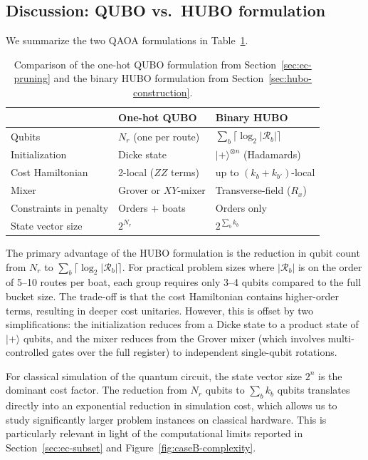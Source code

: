 \documentclass{article}
\begin{document}
\subsection{Discussion: QUBO vs.\ HUBO formulation}
\label{sec:qubo-vs-hubo}

We summarize the two QAOA formulations in Table~\ref{tab:qubo-vs-hubo}.

\begin{table}[h]
    \centering
    \begin{tabular}{>{\raggedright}p{4cm} p{4.5cm} p{4.5cm}}
    \toprule
    & \textbf{One-hot QUBO} & \textbf{Binary HUBO} \\
    \midrule
    Qubits &  $N_r$ (one per route) & $\sum_b \lceil \log_2 |\mathcal{R}_b| \rceil$ \\[0.3em]
    Initialization & Dicke state & $|+\rangle^{\otimes n}$ (Hadamards) \\[0.3em]
    Cost Hamiltonian &  2-local ($ZZ$ terms) &  up to $(k_b + k_{b'})$-local \\[0.3em]
    Mixer & Grover or $XY$-mixer & Transverse-field ($R_x$) \\[0.3em]
    Constraints in penalty & Orders + boats & Orders only \\[0.3em]
    State vector size & $2^{N_r}$ & $2^{\sum_b k_b}$ \\
    \bottomrule
    \end{tabular}
    \caption{Comparison of the one-hot QUBO formulation from Section~\ref{sec:ec-pruning} and the binary HUBO formulation from Section~\ref{sec:hubo-construction}.}
    \label{tab:qubo-vs-hubo}
\end{table}

The primary advantage of the HUBO formulation is the reduction in qubit count from $N_r$ to $\sum_b \lceil \log_2 |\mathcal{R}_b| \rceil$. For practical problem sizes where $|\mathcal{R}_b|$ is on the order of 5--10 routes per boat, each group requires only 3--4 qubits compared to the full bucket size.
The trade-off is that the cost Hamiltonian contains higher-order terms, resulting in deeper cost unitaries. However, this is offset by two simplifications: the initialization reduces from a Dicke state to a product state of $|+\rangle$ qubits, and the mixer reduces from the Grover mixer (which involves multi-controlled gates over the full register) to independent single-qubit rotations.

For classical simulation of the quantum circuit, the state vector size $2^n$ is the dominant cost factor. The reduction from $N_r$ qubits to $\sum_b k_b$ qubits translates directly into an exponential reduction in simulation cost, which allows us to study significantly larger problem instances on classical hardware. This is particularly relevant in light of the computational limits reported in Section~\ref{sec:ec-subset} and Figure~\ref{fig:caseB-complexity}.
\end{document}
